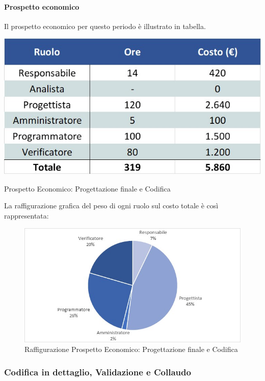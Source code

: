 \paragraph{Prospetto economico}
Il prospetto economico per questo periodo è illustrato in tabella. 
\begin{table}[H]
	\centerline{\includegraphics[scale=0.7]{img/Preventivo/ProgettazioneFinaleCodificaEconomico.jpg}}
	\caption{Prospetto Economico: Progettazione finale e Codifica}
	\clearpage
\end{table}
La raffigurazione grafica del peso di ogni ruolo sul costo totale è così rappresentata: 
\begin{figure}[H]
	\centerline{\includegraphics[scale=0.9]{img/Preventivo/Torte/ProgettazioneFinaleCodifica.jpg}}
	\caption{Raffigurazione Prospetto Economico: Progettazione finale e Codifica}
	\clearpage
\end{figure} 
\newpage
\subsubsection{Codifica in dettaglio, Validazione e Collaudo}
